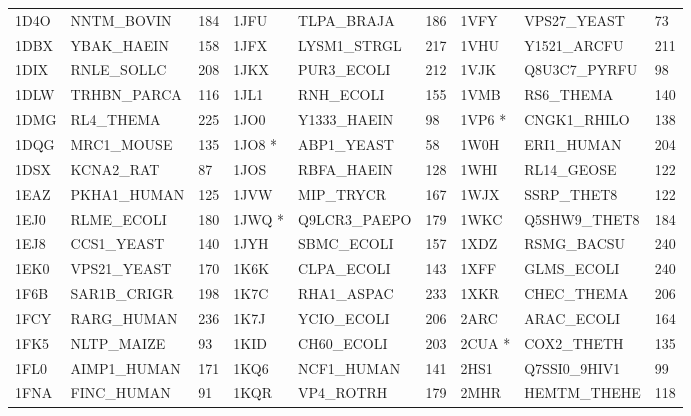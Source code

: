 \documentclass{bioinfo}
\begin{document}
\begin{table}[!t]
{\begin{tabular}{lllllllll}
    1D4O   & NNTM\_BOVIN  & 184             & 1JFU   & TLPA\_BRAJA  & 186             & 1VFY   & VPS27\_YEAST & 73              \\
    1DBX   & YBAK\_HAEIN  & 158             & 1JFX   & LYSM1\_STRGL & 217             & 1VHU   & Y1521\_ARCFU & 211             \\
    1DIX   & RNLE\_SOLLC  & 208             & 1JKX   & PUR3\_ECOLI  & 212             & 1VJK   & Q8U3C7\_PYRFU & 98              \\
    1DLW   & TRHBN\_PARCA & 116             & 1JL1   & RNH\_ECOLI   & 155             & 1VMB   & RS6\_THEMA   & 140             \\
    1DMG   & RL4\_THEMA   & 225             & 1JO0   & Y1333\_HAEIN & 98              & 1VP6 *  & CNGK1\_RHILO & 138             \\
    1DQG   & MRC1\_MOUSE  & 135             & 1JO8 *  & ABP1\_YEAST  & 58              & 1W0H   & ERI1\_HUMAN  & 204             \\
    1DSX   & KCNA2\_RAT   & 87              & 1JOS   & RBFA\_HAEIN  & 128             & 1WHI   & RL14\_GEOSE  & 122             \\
    1EAZ   & PKHA1\_HUMAN & 125             & 1JVW   & MIP\_TRYCR   & 167             & 1WJX   & SSRP\_THET8  & 122             \\
    1EJ0   & RLME\_ECOLI  & 180             & 1JWQ *  & Q9LCR3\_PAEPO & 179             & 1WKC   & Q5SHW9\_THET8 & 184             \\
    1EJ8   & CCS1\_YEAST  & 140             & 1JYH   & SBMC\_ECOLI  & 157             & 1XDZ   & RSMG\_BACSU  & 240             \\
    1EK0   & VPS21\_YEAST & 170             & 1K6K   & CLPA\_ECOLI  & 143             & 1XFF   & GLMS\_ECOLI  & 240             \\
    1F6B   & SAR1B\_CRIGR & 198             & 1K7C   & RHA1\_ASPAC  & 233             & 1XKR   & CHEC\_THEMA  & 206             \\
    1FCY   & RARG\_HUMAN  & 236             & 1K7J   & YCIO\_ECOLI  & 206             & 2ARC   & ARAC\_ECOLI  & 164             \\
    1FK5   & NLTP\_MAIZE  & 93              & 1KID   & CH60\_ECOLI  & 203             & 2CUA *  & COX2\_THETH  & 135             \\
    1FL0   & AIMP1\_HUMAN & 171             & 1KQ6   & NCF1\_HUMAN  & 141             & 2HS1   & Q7SSI0\_9HIV1 & 99              \\
    1FNA   & FINC\_HUMAN  & 91              & 1KQR   & VP4\_ROTRH   & 179             & 2MHR   & HEMTM\_THEHE & 118             \\

\end{tabular}}
\end{table}
\end{document}
